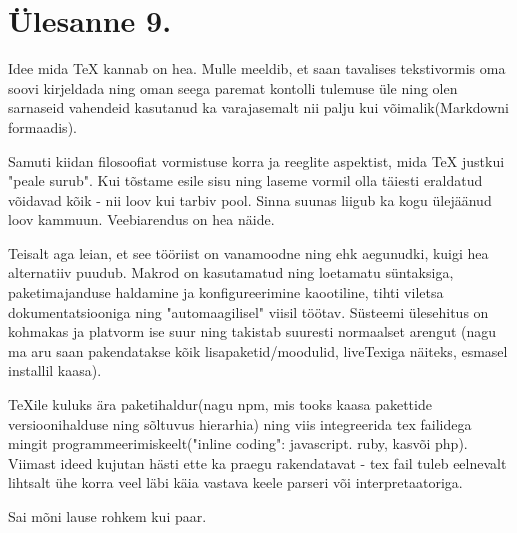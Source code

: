 
\section{Ülesanne 9.}

Idee mida \TeX{} kannab on hea. Mulle meeldib, et saan tavalises tekstivormis oma soovi kirjeldada ning oman seega paremat kontolli tulemuse üle ning olen sarnaseid vahendeid kasutanud ka varajasemalt nii palju kui võimalik(Mark\-downi formaadis).

Samuti kiidan filosoofiat vormistuse korra ja reeglite aspektist, mida \TeX{} justkui "peale surub". Kui tõstame esile sisu ning laseme vormil olla täiesti eraldatud võidavad kõik - nii loov kui tarbiv pool. Sinna suunas liigub ka kogu ülejäänud loov kammuun. Veebiarendus on hea näide.

Teisalt aga leian, et see tööriist on vanamoodne ning ehk aegunudki, kuigi hea alternatiiv puudub. Makrod on kasutamatud ning loetamatu süntaksiga, paketimajanduse haldamine ja konfigureerimine kaootiline, tihti viletsa dokumentatsiooniga ning "automaagilisel" viisil töötav. Süsteemi ülesehitus on kohmakas ja platvorm ise suur ning takistab suuresti normaalset arengut (nagu ma aru saan pakendatakse kõik lisapaketid/moodulid, liveTexiga näiteks, esmasel installil kaasa).

\TeX ile kuluks ära paketihaldur(nagu npm, mis tooks kaasa pakettide versioonihalduse ning sõltuvus hierarhia) ning viis integreerida tex failidega mingit programmeerimiskeelt("inline coding": javascript. ruby, kasvõi php). Viimast ideed kujutan hästi ette ka praegu rakendatavat - tex fail tuleb eelnevalt lihtsalt ühe korra veel läbi käia vastava keele parseri või interpretaatoriga.

Sai mõni lause rohkem kui paar.
